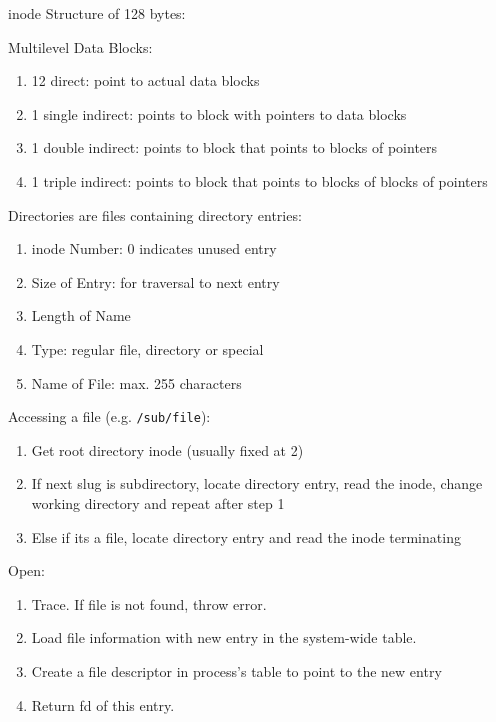 \documentclass[12pt, a4paper]{article}
\begin{document}
\begin{multicols*}{3}
inode Structure of 128 bytes:\\
{\centering{}\par}

Multilevel Data Blocks:
\begin{enumerate}[\roman*.]
  \item 12 direct: point to actual data blocks
  \item 1 single indirect: points to block with pointers to data blocks
  \item 1 double indirect: points to block that points to blocks of pointers
  \item 1 triple indirect: points to block that points to blocks of blocks of pointers
\end{enumerate}

Directories are files containing directory entries:
\begin{enumerate}[\roman*.]
  \item inode Number: 0 indicates unused entry 
  \item Size of Entry: for traversal to next entry 
  \item Length of Name 
  \item Type: regular file, directory or special 
  \item Name of File: max. 255 characters
\end{enumerate}

{\centering{}\par}

\colbreak
Accessing a file (e.g. \lstinline|/sub/file|):
\begin{enumerate}[\roman*.]
  \item Get root directory inode (usually fixed at 2)
  \item If next slug is subdirectory, locate directory entry, read the inode, change working directory and repeat after step 1 
  \item Else if its a file, locate directory entry and read the inode terminating
\end{enumerate}

{\centering{}\par}

Open:
\begin{enumerate}[\roman*.]
  \item Trace. If file is not found, throw error.
  \item Load file information with new entry in the system-wide table.
  \item Create a file descriptor in process's table to point to the new entry
  \item Return fd of this entry.
\end{enumerate}


\end{multicols*}
\end{document}

